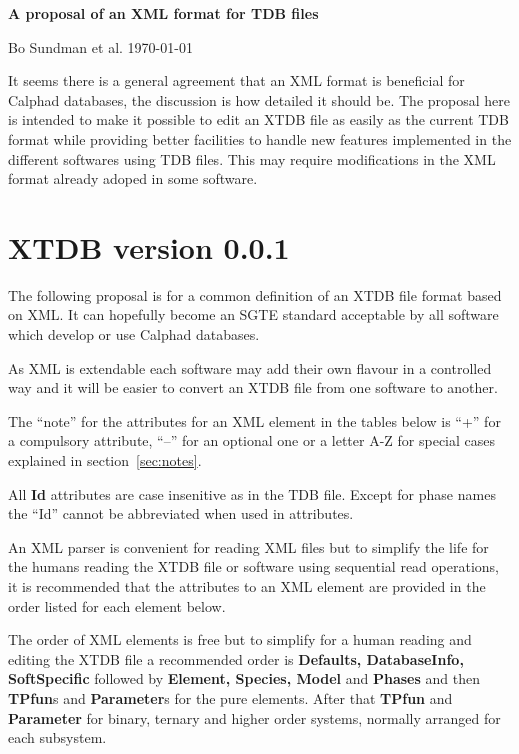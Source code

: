 \documentclass{article}
\begin{document}
\begin{center}

  {\Large \bf A proposal of an XML format for TDB files}

  Bo Sundman et al. \today
\end{center}

It seems there is a general agreement that an XML format is beneficial
for Calphad databases, the discussion is how detailed it should be.
The proposal here is intended to make it possible to edit an XTDB file
as easily as the current TDB format while providing better facilities
to handle new features implemented in the different softwares using
TDB files.  This may require modifications in the XML format already
adoped in some software.

\section{XTDB version 0.0.1}

The following proposal is for a common definition of an XTDB file
format based on XML.  It can hopefully become an SGTE standard
acceptable by all software which develop or use Calphad databases.

As XML is extendable each software may add their own flavour in a
controlled way and it will be easier to convert an XTDB file from one
software to another.

The ``note'' for the attributes for an XML element in the tables below
is ``+'' for a compulsory attribute, ``--'' for an optional one or a
letter A-Z for special cases explained in section~\ref{sec:notes}.

All {\bf Id} attributes are case insenitive as in the TDB file.
Except for phase names the ``Id'' cannot be abbreviated when used in
attributes.

An XML parser is convenient for reading XML files but to simplify the
life for the humans reading the XTDB file or software using sequential
read operations, it is recommended that the attributes to an XML
element are provided in the order listed for each element below.

The order of XML elements is free but to simplify for a human reading
and editing the XTDB file a recommended order is {\bf Defaults,
  DatabaseInfo, SoftSpecific} followed by {\bf Element, Species,
  Model} and {\bf Phases} and then {\bf TPfun}s and {\bf Parameter}s
for the pure elements.  After that {\bf TPfun} and {\bf Parameter} for
binary, ternary and higher order systems, normally arranged for each
subsystem.
\end{document}
